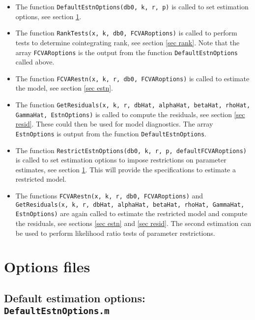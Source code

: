 \documentclass[12pt]{article}
\begin{document}
\begin{itemize}

\item The function \texttt{DefaultEstnOptions(db0, k, r, p)} is called to set estimation options, see section \ref{sec options}.

\item The function \texttt{RankTests(x, k, db0, FCVARoptions)} is called to perform tests to determine cointegrating rank, see section \ref{sec rank}. Note that the array \texttt{FCVARoptions} is the output from the function \texttt{DefaultEstnOptions} called above.

\item The function \texttt{FCVARestn(x, k, r, db0, FCVARoptions)} is called to estimate the model, see section \ref{sec estn}.

\item The function \texttt{GetResiduals(x, k, r, dbHat, alphaHat, betaHat, rhoHat, GammaHat, EstnOptions)} is called to compute the residuals, see section \ref{sec resid}. These could then be used for model diagnostics. The array \texttt{EstnOptions} is output from the function \texttt{DefaultEstnOptions}.

\item The function \texttt{RestrictEstnOptions(db0, k, r, p, defaultFCVARoptions)} is called to set estimation options to impose restrictions on parameter estimates, see section \ref{sec options}. This will provide the specifications to estimate a restricted model.

\item The functions \texttt{FCVARestn(x, k, r, db0, FCVARoptions)} and \texttt{GetResiduals(x, k, r, dbHat, alphaHat, betaHat, rhoHat, GammaHat, EstnOptions)} are again called to estimate the restricted model and compute the residuals, see sections \ref{sec estn} and \ref{sec resid}. The second estimation can be used to perform likelihood ratio tests of parameter restrictions.


\end{itemize}



\newpage


\section{Options files}\label{sec options}

\subsection{Default estimation options: \texttt{DefaultEstnOptions.m} }
\end{document}
